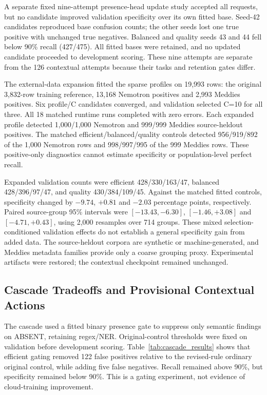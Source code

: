 \documentclass[conference]{IEEEtran}
\begin{document}
A separate fixed nine-attempt presence-head update study accepted all requests, but no candidate improved validation specificity over its own fitted base. Seed-42 candidates reproduced base confusion counts; the other seeds lost one true positive with unchanged true negatives. Balanced and quality seeds 43 and 44 fell below 90\% recall (427/475). All fitted bases were retained, and no updated candidate proceeded to development scoring. These nine attempts are separate from the 126 contextual attempts because their tasks and retention gates differ.

The external-data expansion fitted the sparse profiles on 19,993 rows: the original 3,832-row training reference, 13,168 Nemotron positives and 2,993 Meddies positives. Six profile/C candidates converged, and validation selected C=10 for all three. All 18 matched runtime runs completed with zero errors. Each expanded profile detected 1,000/1,000 Nemotron and 999/999 Meddies source-heldout positives. The matched efficient/balanced/quality controls detected 956/919/892 of the 1,000 Nemotron rows and 998/997/995 of the 999 Meddies rows. These positive-only diagnostics cannot estimate specificity or population-level perfect recall.

Expanded validation counts were efficient 428/330/163/47, balanced 428/396/97/47, and quality 430/384/109/45. Against the matched fitted controls, specificity changed by $-9.74$, $+0.81$ and $-2.03$ percentage points, respectively. Paired source-group 95\% intervals were $[-13.43,-6.30]$, $[-1.46,+3.08]$ and $[-4.71,+0.43]$, using 2,000 resamples over 714 groups. These mixed selection-conditioned validation effects do not establish a general specificity gain from added data. The source-heldout corpora are synthetic or machine-generated, and Meddies metadata families provide only a coarse grouping proxy. Experimental artifacts were restored; the contextual checkpoint remained unchanged.

\subsection{Cascade Tradeoffs and Provisional Contextual Actions}

The cascade used a fitted binary presence gate to suppress only semantic findings on ABSENT, retaining regex/NER. Original-control thresholds were fixed on validation before development scoring. Table~\ref{tab:cascade_results} shows that efficient gating removed 122 false positives relative to the revised-rule ordinary original control, while adding five false negatives. Recall remained above 90\%, but specificity remained below 90\%. This is a gating experiment, not evidence of cloud-training improvement.
\end{document}
